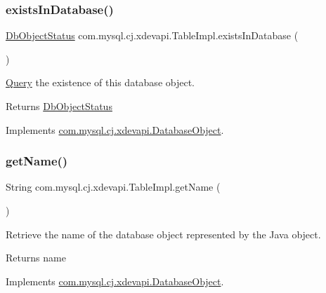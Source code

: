 \subsubsection{\texorpdfstring{exists\+In\+Database()}{existsInDatabase()}}
{\footnotesize\ttfamily \mbox{\hyperlink{enumcom_1_1mysql_1_1cj_1_1xdevapi_1_1_database_object_1_1_db_object_status}{Db\+Object\+Status}} com.\+mysql.\+cj.\+xdevapi.\+Table\+Impl.\+exists\+In\+Database (\begin{DoxyParamCaption}{ }\end{DoxyParamCaption})}

\mbox{\hyperlink{interfacecom_1_1mysql_1_1cj_1_1_query}{Query}} the existence of this database object.

\begin{DoxyReturn}{Returns}
\mbox{\hyperlink{}{Db\+Object\+Status}} 
\end{DoxyReturn}


Implements \mbox{\hyperlink{interfacecom_1_1mysql_1_1cj_1_1xdevapi_1_1_database_object_ab4215a82b546a9e1dcb344c339765d7a}{com.\+mysql.\+cj.\+xdevapi.\+Database\+Object}}.

\mbox{\label{classcom_1_1mysql_1_1cj_1_1xdevapi_1_1_table_impl_aeef36a88f386e5a6a7375315ab2af2c8}} 
\subsubsection{\texorpdfstring{get\+Name()}{getName()}}
{\footnotesize\ttfamily String com.\+mysql.\+cj.\+xdevapi.\+Table\+Impl.\+get\+Name (\begin{DoxyParamCaption}{ }\end{DoxyParamCaption})}

Retrieve the name of the database object represented by the Java object.

\begin{DoxyReturn}{Returns}
name 
\end{DoxyReturn}


Implements \mbox{\hyperlink{interfacecom_1_1mysql_1_1cj_1_1xdevapi_1_1_database_object_a482b3ae6f40ec6332bb7d8d8d02d1dda}{com.\+mysql.\+cj.\+xdevapi.\+Database\+Object}}.

\mbox{\label{classcom_1_1mysql_1_1cj_1_1xdevapi_1_1_table_impl_a8aac02838d6b25aeeaaa53c4a34f4bac}} 
